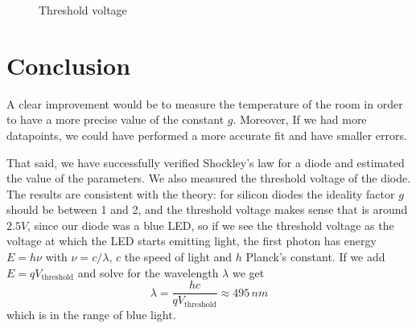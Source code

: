 \documentclass{report}
\newcounter{theo}[section]\setcounter{theo}{0}
\numberwithin{equation}{section}
\theoremstyle{plain}
\theoremstyle{definition}
\theoremstyle{remark}
\begin{document}
\begin{figure}
    \centering
{}
\caption{Threshold voltage}\label{fig:threshold}
\end{figure}

\section{Conclusion}
A clear improvement would be to measure the temperature of
the room in order to have a more precise value of the constant \(g\). Moreover,
If we had more datapoints, we could have performed a more accurate fit and have
smaller errors. 

That said, we have successfully verified Shockley's law for a diode and
estimated the value of the parameters. We also measured the threshold voltage of
the diode. The results are consistent with the theory: for silicon diodes the
ideality factor \(g\) should be between 1 and 2, and the threshold voltage makes
sense that is around \(2.5V\), since our diode was a blue LED, so if we see the
threshold voltage as the voltage at which the LED starts emitting light, the
first photon has energy \(E = h\nu\) with \(\nu = c/\lambda \), \(c\) the speed of light and \(h\) Planck's constant. If we
add \(E = qV_\text{threshold}  \) and solve for the wavelength \(\lambda\) we get
\[
    \lambda = \frac{hc}{qV_\text{threshold}  } \approx 495 \, nm
\]
which is in the range of blue light.
\end{document}
